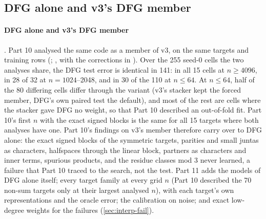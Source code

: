 \begin{table}[tbp]
\centering{\scriptsize\setlength{\tabcolsep}{3.6pt}
}
\caption{Spurious terms on the 21  and 20  targets, seed 0, 41 fits per $n$ . A term is spurious if it reads an input on which the target does not depend; a sum block counts as one term. ``Linear-block characters'': irrelevant degree-1 characters that entered with the linear block. Spurious share: the standard deviation of the spurious terms' summed contribution over that of the model's output. Test error with and without the spurious terms' contributions, mean over the 41 fits; from $n=128$ on the two differ by at most 0.0002 (). Source:  (\texttt{A2.by\_n}), via .}
\label{tab:interp-spur}
\end{table}

\subsection{DFG alone and v3's DFG member}\label{app:interp-v3}

\paragraph{DFG alone and v3's DFG member} . Part 10 analysed the same code as a member of v3, on the same targets and training rows (\cite{portfoliolearner2026}; , with the corrections in ). Over the 255 seed-0 cells the two analyses share, the DFG test error is identical in 141: in all 15 cells at $n\ge4096$, in 28 of 32 at $n=1024$--2048, and in 30 of the 110 at $n\le64$. At $n\le64$, half of the 80 differing cells differ through the variant (v3's stacker kept the forced member, DFG's own paired test the default), and most of the rest are cells where the stacker gave DFG no weight, so that Part 10 described an out-of-fold fit. Part 10's first $n$ with the exact signed blocks is the same for all 15 targets where both analyses have one. Part 10's findings on v3's member therefore carry over to DFG alone: the exact signed blocks of the symmetric targets, parities and small juntas as characters, halfspaces through the linear block, partners as characters and inner terms, spurious products, and the residue classes mod 3 never learned, a failure that Part 10 traced to the search, not the test. Part 11 adds the models of DFG alone itself; every target family at every grid $n$ (Part 10 described the 70 non-sum targets only at their largest analysed $n$), with each target's own representations and the oracle error; the calibration on noise; and exact low-degree weights for the failures (\cref{sec:interp-fail}).

